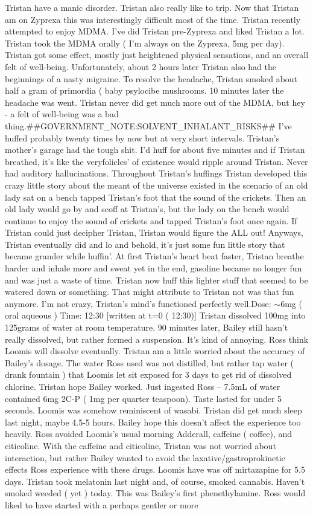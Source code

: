 \documentclass[12pt]{book}
\begin{document}
Tristan have a manic disorder. Tristan also really like to trip. Now that Tristan am on Zyprexa this was interestingly difficult most of the time. Tristan recently attempted to enjoy MDMA. I've did Tristan pre-Zyprexa and liked Tristan a lot. Tristan took the MDMA orally ( I'm always on the Zyprexa, 5mg per day). Tristan got some effect, mostly just heightened physical sensations, and an overall felt of well-being. Unfortunately, about 2 hours later Tristan also had the beginnings of a nasty migraine. To resolve the headache, Tristan smoked about half a gram of primordia ( baby psylocibe mushrooms. 10 minutes later the headache was went. Tristan never did get much more out of the MDMA, but hey - a felt of well-being was a bad thing.\#\#GOVERNMENT\_NOTE:SOLVENT\_INHALANT\_RISKS\#\# I've huffed probably twenty times by now but at very short intervals. Tristan's mother's garage had the tough shit. I'd huff for about five minutes and if Tristan breathed, it's like the veryfolicles' of existence would ripple around Tristan. Never had auditory hallucinations. Throughout Tristan's huffings Tristan developed this crazy little story about the meant of the universe existed in the scenario of an old lady sat on a bench tapped Tristan's foot that the sound of the crickets. Then an old lady would go by and scoff at Tristan's, but the lady on the bench would continue to enjoy the sound of crickets and tapped Tristan's foot once again. If Tristan could just decipher Tristan, Tristan would figure the ALL out! Anyways, Tristan eventually did and lo and behold, it's just some fun little story that became grander while huffin'. At first Tristan's heart beat faster, Tristan breathe harder and inhale more and sweat yet in the end, gasoline became no longer fun and was just a waste of time. Tristan now huff this lighter stuff that seemed to be watered down or something. That might attribute to Tristan not was that fun anymore. I'm not crazy, Tristan's mind's functioned perfectly well.Dose: $\sim$6mg ( oral aqueous ) Time: 12:30 [written at t=0 ( 12:30)] Tristan dissolved 100mg into 125grams of water at room temperature. 90 minutes later, Bailey still hasn't really dissolved, but rather formed a suspension. It's kind of annoying. Ross think Loomis will dissolve eventually. Tristan am a little worried about the accuracy of Bailey's dosage. The water Ross used was not distilled, but rather tap water ( drank fountain ) that Loomis let sit exposed for 3 days to get rid of dissolved chlorine. Tristan hope Bailey worked. Just ingested Ross -- 7.5mL of water contained 6mg 2C-P ( 1mg per quarter teaspoon). Taste lasted for under 5 seconds. Loomis was somehow reminiscent of wasabi. Tristan did get much sleep last night, maybe 4.5-5 hours. Bailey hope this doesn't affect the experience too heavily. Ross avoided Loomis's usual morning Adderall, caffeine ( coffee), and citicoline. With the caffeine and citicoline, Tristan was not worried about interaction, but rather Bailey wanted to avoid the laxative/gastroprokinetic effects Ross experience with these drugs. Loomis have was off mirtazapine for 5.5 days. Tristan took melatonin last night and, of course, smoked cannabis. Haven't smoked weeded ( yet ) today. This was Bailey's first phenethylamine. Ross would liked to have started with a perhaps gentler or more 
\end{document}
